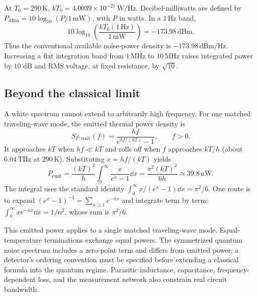 \begin{example}[title={Thermal noise density at 290 K}]
At $T_0=290\,\mathrm K$, $kT_0=4.0039\times10^{-21}\,\mathrm{W/Hz}$. Decibel-milliwatts are defined by $P_{\mathrm{dBm}}=10\log_{10}(P/1\,\mathrm{mW})$, with $P$ in watts. In a $1\,\mathrm{Hz}$ band,
\[
10\log_{10}\!\left(\frac{kT_0(1\,\mathrm{Hz})}{1\,\mathrm{mW}}\right)
=-173.98\,\mathrm{dBm}.
\]
Thus the conventional available noise-power density is $-173.98\,\mathrm{dBm/Hz}$. Increasing a flat integration band from $1\,\mathrm{MHz}$ to $10\,\mathrm{MHz}$ raises integrated power by $10$ dB and RMS voltage, at fixed resistance, by $\sqrt{10}$.
\end{example}

\subsection{Beyond the classical limit}
A white spectrum cannot extend to arbitrarily high frequency. For one matched traveling-wave mode, the emitted thermal power density is
\[
S_{P,\mathrm{emit}}(f)=\frac{hf}{e^{hf/(kT)}-1},\qquad f>0.
\]
It approaches $kT$ when $hf\ll kT$ and rolls off when $f$ approaches $kT/h$ (about $6.04\,\mathrm{THz}$ at $290\,\mathrm K$). Substituting $x=hf/(kT)$ yields
\[
P_{\mathrm{emit}}=\frac{(kT)^2}{h}\int_0^\infty\frac{x}{e^x-1}\dd x
=\frac{\pi^2(kT)^2}{6h}\simeq39.8\,\mathrm{nW}.
\]
The integral uses the standard identity $\int_0^\infty x/(e^x-1)\dd x=\pi^2/6$. One route is to expand $(e^x-1)^{-1}=\sum_{n\geq1}e^{-nx}$ and integrate term by term: $\int_0^\infty xe^{-nx}\dd x=1/n^2$, whose sum is $\pi^2/6$.

This emitted power applies to a single matched traveling-wave mode. Equal-temperature terminations exchange equal powers. The symmetrized quantum noise spectrum includes a zero-point term and differs from emitted power; a detector's ordering convention must be specified before extending a classical formula into the quantum regime. Parasitic inductance, capacitance, frequency-dependent loss, and the measurement network also constrain real circuit bandwidth.
